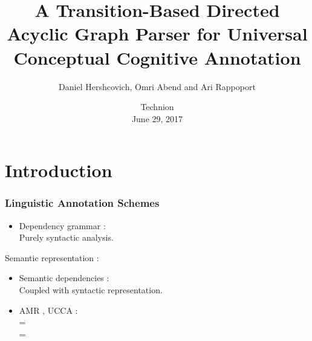 \documentclass[t]{beamer}
\begin{document}
\title[A Transition-Based DAG Parser for UCCA]{A Transition-Based Directed Acyclic Graph Parser for Universal Conceptual Cognitive Annotation}
\author{Daniel Hershcovich, Omri Abend and Ari Rappoport}
\date{Technion \\ June 29, 2017}

\begin{frame}
\titlepage
\end{frame}



\section{Introduction}

\begin{frame}
\linespread{1.5}
\frametitle{Linguistic Annotation Schemes}
\begin{itemize}
	\setlength{\itemindent}{-3em}
	\item Dependency grammar \cite{Tesn:59,nivre2005dependency}: \\
		Purely syntactic analysis.
\end{itemize}

Semantic representation \cite{abend2017the}:
\begin{itemize}
	\setlength{\itemindent}{-3em}
	\item Semantic dependencies \cite{oepen2015semeval}: \\
		Coupled with syntactic representation.
	\item AMR \cite{banarescu2013abstract}, UCCA \cite{abend2013universal}: \\
		 =  \\
		 = 
\end{itemize}
\end{frame}
\end{document}
